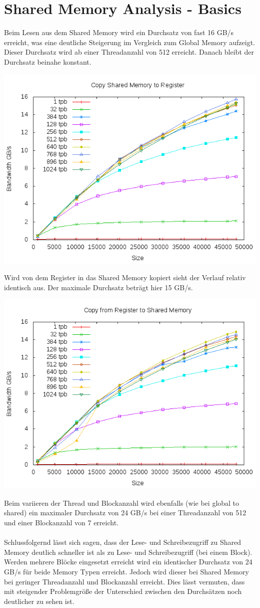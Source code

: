 \documentclass{article}
\newcommand{\enterProblemHeader}[1]{
}
\newcommand{\exitProblemHeader}[1]{
}
\newcounter{homeworkProblemCounter} %
\newcommand{\homeworkProblemName}{}
\newenvironment{homeworkProblem}[1][Problem \arabic{homeworkProblemCounter}]{ %
\stepcounter{homeworkProblemCounter} %
\renewcommand{\homeworkProblemName}{#1} %
\section{\homeworkProblemName} %
}{
}
\begin{document}
\begin{homeworkProblem}[Shared Memory Analysis - Basics]
Beim Lesen aus dem Shared Memory wird ein Durchsatz von fast 16 GB/s erreicht, was
eine deutliche Steigerung im Vergleich zum Global Memory aufzeigt. Dieser Durchsatz
wird ab einer Threadanzahl von 512 erreicht. Danach bleibt der Durchsatz beinahe
konstant.
\begin{center}
\includegraphics[width=0.8\columnwidth]{share2reg.png}
\end{center}
Wird von dem Register in das Shared Memory kopiert sieht der Verlauf relativ
identisch aus. Der maximale Durchsatz beträgt hier 15 GB/s. 
\begin{center}
\includegraphics[width=0.8\columnwidth]{reg2share.png}
\end{center}
Beim variieren der Thread und Blockanzahl wird ebenfalls (wie bei global to shared)
ein maximaler Durchsatz von 24 GB/s bei einer Threadanzahl von 512 und einer
Blockanzahl von 7 erreicht.
\\\\
Schlussfolgernd lässt sich sagen, dass der Lese- und Schreibezugriff zu Shared Memory
deutlich schneller ist als zu Lese- und Schreibezugriff (bei einem Block). Werden 
mehrere Blöcke eingesetzt erreicht wird ein identischer Durchsatz von 24 GB/s für beide
Memory Typen erreicht. Jedoch wird dieser bei Shared Memory bei geringer Threadanzahl
und Blockanzahl erreicht. Dies lässt vermuten, dass mit steigender Problemgröße der
Unterschied zwischen den Durchsätzen noch deutlicher zu sehen ist.
\end{homeworkProblem}
\end{document}

